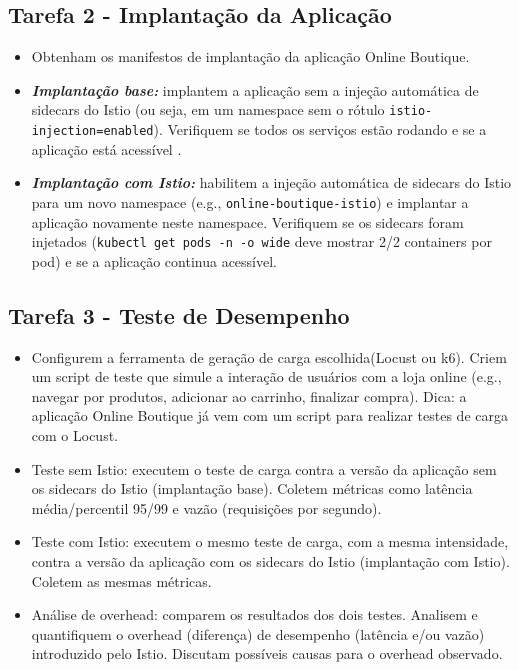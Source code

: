 \documentclass[12pt,a4paper]{report}
\begin{document}
\subsection{Tarefa 2 - Implantação da Aplicação}
\begin{itemize}
    \item Obtenham os manifestos de implantação da aplicação Online Boutique.
    \item \textbf{\textit{Implantação base:}} implantem a aplicação sem a injeção automática de sidecars do Istio (ou seja, em um namespace sem o rótulo \texttt{istio-injection=enabled}). Verifiquem se todos os serviços estão rodando e se a aplicação está acessível .
    \item \textbf{\textit{Implantação com Istio:}} habilitem a injeção automática de sidecars do Istio para um novo namespace (e.g., \texttt{online-boutique-istio}) e implantar a aplicação novamente neste namespace. Verifiquem se os sidecars foram injetados (\texttt{kubectl get pods -n -o wide} deve mostrar 2/2 containers por pod) e se a aplicação continua acessível.
\end{itemize}

\subsection{Tarefa 3 - Teste de Desempenho}
\begin{itemize}
    \item Configurem a ferramenta de geração de carga escolhida(Locust ou k6). Criem um script de teste que simule a interação de usuários com a loja online (e.g., navegar por produtos, adicionar ao carrinho, finalizar compra). Dica: a aplicação Online Boutique já vem com um script para realizar testes de carga com o Locust.
    \item Teste sem Istio: executem o teste de carga contra a versão da aplicação sem os sidecars do Istio (implantação base). Coletem métricas como latência média/percentil 95/99 e vazão (requisições por segundo).
    \item Teste com Istio: executem o mesmo teste de carga, com a mesma intensidade, contra a versão da aplicação com os sidecars do Istio (implantação com Istio). Coletem as mesmas métricas.
    \item Análise de overhead: comparem os resultados dos dois testes. Analisem e quantifiquem o overhead (diferença) de desempenho (latência e/ou vazão) introduzido pelo Istio. Discutam possíveis causas para o overhead observado.
\end{itemize}
\end{document}
